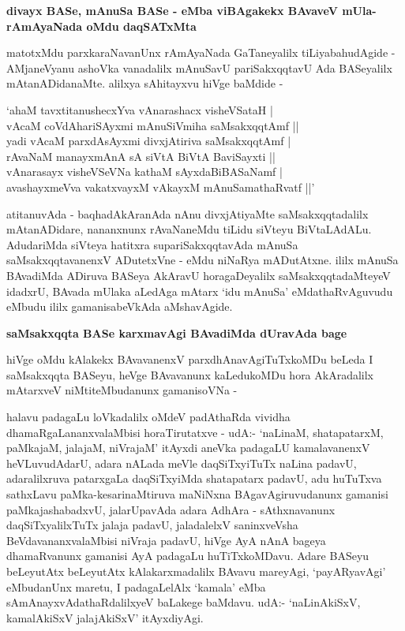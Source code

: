 {\bigskip
\noindent
{\large\bf divayx BASe, mAnuSa BASe - eMba viBAgakekx BAvaveV mUla-rAmAyaNada oMdu daqSATxMta}}\label{page14}
\medskip

\noindent
matotxMdu parxkaraNavanUnx rAmAyaNada GaTaneyalilx tiLiyabahudAgide - AMjaneVyanu a\-shoVka vana\-dalilx mAnuSavU pariSakxqqtavU Ada BASeyalilx mAtanADidanaMte. alilxya sAhitayxvu hiVge baMdide - 

\smallskip
\begin{shloka}
`ahaM tavxtitanushecxYva vAnarashacx visheVSataH |\\\label{14}
vAcaM coVdAhariSAyxmi mAnuSiVmiha saMsakxqqtAmf ||\\[4pt]

yadi vAcaM parxdAsAyxmi divxjAtiriva saMsakxqqtAmf |\\
rAvaNaM manayxmAnA sA siVtA BiVtA BaviSayxti ||\\[4pt]

vAnarasayx visheVSeVNa kathaM sAyxdaBiBASaNamf |\\
avashayxmeVva vakatxvayxM vAkayxM mAnuSamathaRvatf ||'
\end{shloka}
\smallskip

\noindent
atitanuvAda - baqhadAkAranAda nAnu divxjAtiyaMte saMsakxqqtadalilx mAtanADi\-dare, nananxnunx rAvaNa\-neMdu tiLidu siVteyu BiVtaLAdALu. AdudariMda siVteya hatitxra supariSakxqqtavAda mAnuSa saMsakxqqta\-vanenxV ADutetxVne - eMdu niNaRya mADutAtxne. ililx mAnuSa BAvadiMda ADiruva BASeya AkA\-ravU horagaDeyalilx saMsakxqqtadaMteyeV idadxrU, BAvada mUlaka aLedAga mAtarx `idu mAnuSa' eMdathaRvAguvudu eMbudu ililx gamanisabeVkAda aMshavAgide.

\newpage

{\bigskip
\noindent
{\large\bf saMsakxqqta BASe karxmavAgi BAvadiMda dUravAda bage}}\label{page15}
\medskip

\noindent
hiVge oMdu kAlakekx BAvavanenxV parxdhAnavAgiTuTxkoMDu beLeda I saMsakxqqta BASeyu, heVge BAva\-vanunx kaLedukoMDu hora AkAradalilx mAtarxveV niMtiteMbudanunx gamanisoVNa - 

halavu padagaLu loVkadalilx oMdeV padAthaRda vividha dhamaRgaLananxvalaMbisi horaTirutatxve - udA:- `naLinaM, shatapatarxM, paMkajaM, jalajaM, niVrajaM' itAyxdi aneVka padagaLU kamalavanenxV heVLuvu\-dAdarU, adara nALada meVle daqSiTxyiTuTx naLina padavU, adaralilxruva patarxgaLa daqSiTxyiMda shata\-patarx pada\-vU, adu huTuTxva sathxLavu paMka-kesarinaMtiruva maNiNxna BAgavAgiruvudanunx gamanisi paMkaja\-shabadxvU, jalarUpavAda adara AdhAra - sAthxnavanunx daqSiTxyalilxTuTx jalaja padavU, jaladalelxV saninx\-veVsha BeVda\-vananxva\-laMbisi niVraja padavU, hiVge AyA nAnA bageya dhamaRvanunx gamanisi AyA padagaLu huTiTx\-koMDavu. Adare BASeyu beLeyutAtx beLeyutAtx kAlakarxmadalilx BAvavu mareyAgi, `payARya\-vAgi' eMbudanUnx maretu, I padagaLelAlx `kamala' eMba sAmAnayxvAdathaRdalilxyeV baLakege baMdavu. udA:- `naLinAkiSxV, kamalAkiSxV jalajAkiSxV' itAyxdiyAgi.

